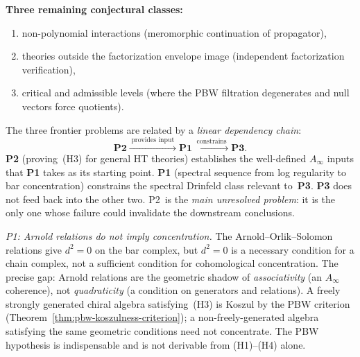\begin{remark}
\smallskip
\noindent\textbf{Three remaining conjectural classes:}
\begin{enumerate}[label=\textup{(\alph*)},nosep]
\item non-polynomial interactions (meromorphic continuation of
 propagator),
\item theories outside the factorization envelope image
 (independent factorization verification),
\item critical and admissible levels (where the PBW filtration
 degenerates and null vectors force quotients).
\end{enumerate}
\end{remark}

\begin{remark}
\label{rem:frontier-dependency-structure}

The three frontier problems are related by a
\emph{linear dependency chain}:
\[
\textbf{P2}
\xrightarrow{\;\text{provides input}\;}
\textbf{P1}
\xrightarrow{\;\text{constrains}\;}
\textbf{P3}.
\]
\textbf{P2} (proving~(H3) for general HT theories)
establishes the well-defined $A_\infty$ inputs that
\textbf{P1} takes as its starting point.
\textbf{P1} (spectral sequence from log regularity to
bar concentration) constrains the spectral Drinfeld
class relevant to~\textbf{P3}.
\textbf{P3} does not feed back into the other two.
P2~is the \emph{main unresolved problem}: it is the
only one whose failure could invalidate the downstream
conclusions.

\smallskip
\noindent\emph{P1: Arnold relations do not imply
concentration.}
The Arnold--Orlik--Solomon relations give $d^2 = 0$ on
the bar complex, but $d^2 = 0$ is a necessary condition
for a chain complex, not a sufficient condition for
cohomological concentration. The precise gap: Arnold
relations are the geometric shadow of \emph{associativity}
(an $A_\infty$ coherence), not \emph{quadraticity}
(a condition on generators and relations). A freely
strongly generated chiral algebra satisfying~(H3) is
Koszul by the PBW criterion
(Theorem~\ref{thm:pbw-koszulness-criterion}); a
non-freely-generated algebra satisfying the same
geometric conditions need not concentrate. The PBW
hypothesis is indispensable and is not derivable from
(H1)--(H4) alone.


\end{remark}

